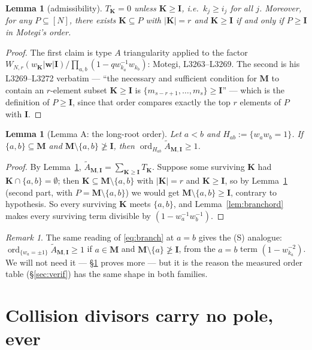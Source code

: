 \documentclass[11pt]{article}
\theoremstyle{plain}
\newtheorem{lem}[thm]{Lemma}
\theoremstyle{definition}
\theoremstyle{remark}
\newtheorem{rem}[thm]{Remark}
\theoremstyle{plain}
\newcommand{\bI}{\mathbf{I}}
\newcommand{\bM}{\mathbf{M}}
\newcommand{\bK}{\mathbf{K}}
\newcommand{\bw}{\mathbf{w}}
\newcommand{\At}{\widetilde{A}}
\newcommand{\ord}{\operatorname{ord}}
\begin{document}
\begin{lem}[admissibility]\label{lem:adm}
$T_{\bK}=0$ unless $\bK\ge\bI$, i.e.\ $k_j\ge i_j$ for all $j$.  Moreover, for
any $P\subseteq[N]$, there exists $\bK\subseteq P$ with $|\bK|=r$ and
$\bK\ge\bI$ if and only if $P\ge\bI$ in Motegi's order.
\end{lem}
\begin{proof}
The first claim is type $A$ triangularity applied to the factor
$W_{N,r}(w_{\bK}|\bw|\bI)/\prod_{a,b}(1-qw_{k_a}^{-1}w_{k_b})$: Motegi, L3263--L3269.
The second is his L3269--L3272 verbatim --- ``the necessary and sufficient
condition for $\bM$ to contain an $r$-element subset $\bK\ge\bI$ is
$\{m_{s-r+1},\dots,m_s\}\ge\bI$'' --- which is the definition of $P\ge\bI$,
since that order compares exactly the top $r$ elements of $P$ with $\bI$.
\end{proof}

\begin{lem}[Lemma A: the long-root order]\label{lem:A}
Let $a<b$ and $H_{ab}:=\{w_aw_b=1\}$.  If $\{a,b\}\subseteq\bM$ and
$\bM\setminus\{a,b\}\not\ge\bI$, then $\ord_{H_{ab}}\At_{\bM,\bI}\ge1$.
\end{lem}
\begin{proof}
By Lemma~\ref{lem:adm}, $\At_{\bM,\bI}=\sum_{\bK\ge\bI}T_{\bK}$.  Suppose some
surviving $\bK$ had $\bK\cap\{a,b\}=\emptyset$; then
$\bK\subseteq\bM\setminus\{a,b\}$ with $|\bK|=r$ and $\bK\ge\bI$, so by
Lemma~\ref{lem:adm} (second part, with $P=\bM\setminus\{a,b\}$) we would get
$\bM\setminus\{a,b\}\ge\bI$, contrary to hypothesis.  So every surviving $\bK$
meets $\{a,b\}$, and Lemma~\ref{lem:branchord} makes every surviving term
divisible by $(1-w_a^{-1}w_b^{-1})$.
\end{proof}

\begin{rem}
The same reading of \eqref{eq:branch} at $a=b$ gives the (S) analogue:
$\ord_{\{w_a=\pm1\}}\At_{\bM,\bI}\ge1$ if $a\in\bM$ and
$\bM\setminus\{a\}\not\ge\bI$, from the $a=b$ term
$(1-w_{k_a}^{-2})$.  We will not need it --- \S\ref{sec:collision} proves more
--- but it is the reason the measured order table (\S\ref{sec:verif}) has the
same shape in both families.
\end{rem}

\section{Collision divisors carry no pole, ever}
\label{sec:collision}
\end{document}
